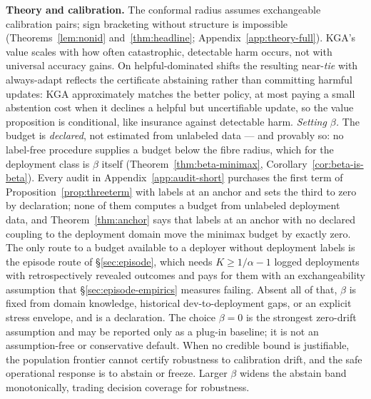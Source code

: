 \textbf{Theory and calibration.} The conformal radius assumes exchangeable calibration pairs;
sign bracketing without structure is impossible (Theorems~\ref{lem:nonid}
and~\ref{thm:headline}; Appendix~\ref{app:theory-full}). \textsc{KGA}'s value scales with how often catastrophic,
detectable harm occurs, not with universal accuracy gains. On helpful-dominated shifts the
resulting near-\emph{tie} with always-adapt reflects the certificate abstaining rather than
committing harmful updates: \textsc{KGA} approximately matches the better policy, at most paying a
small abstention cost when it declines a helpful but uncertifiable update, so the value proposition
is conditional, like insurance against detectable harm.
\emph{Setting $\beta$.} The budget is \emph{declared}, not estimated from unlabeled data --- and
provably so: no label-free procedure supplies a budget below the fibre radius, which for the
deployment class is $\beta$ itself (Theorem~\ref{thm:beta-minimax},
Corollary~\ref{cor:beta-is-beta}). Every audit in Appendix~\ref{app:audit-short} purchases the first
term of Proposition~\ref{prop:threeterm} with labels at an anchor and sets the third to zero by
declaration; none of them computes a budget from unlabeled deployment data, and
Theorem~\ref{thm:anchor} says that labels at an anchor with no declared coupling to the deployment
domain move the minimax budget by exactly zero. The only route to a budget available to a deployer
without deployment labels is the episode route of \S\ref{sec:episode}, which needs
$K\ge1/\alpha-1$ logged deployments with retrospectively revealed outcomes and pays for them with
an exchangeability assumption that \S\ref{sec:episode-empirics} measures failing. Absent all of
that, $\beta$ is fixed from domain knowledge, historical dev-to-deployment gaps, or an explicit
stress envelope, and is a declaration.
The choice $\beta{=}0$ is the strongest zero-drift assumption and may be reported only as a plug-in baseline; it is not an assumption-free or conservative default. When no credible bound is justifiable, the population frontier cannot certify robustness to calibration drift, and the safe operational response is to abstain or freeze. Larger $\beta$ widens the abstain band monotonically, trading decision coverage for robustness.

